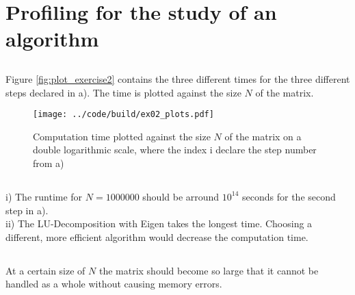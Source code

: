 \section{ Profiling for the study of an algorithm}

\subsection{}
\subsection{}
Figure \autoref{fig:plot_exercise2} contains the three different times for the three different steps declared in a).
The time is plotted against the size $N$ of the matrix.

\begin{figure}[h]
    \centering
    \texttt{[image: ../code/build/ex02\_plots.pdf]}
    \caption{Computation time plotted against the size $N$ of the matrix on a double logarithmic scale, where the index i declare the step number from a)}
    \label{fig:plot_exercise2}
\end{figure}

\subsection{}
i) The runtime for $N= 1000000$ should be arround $10^{14}$ seconds for the second step in a).\\
ii) The LU-Decomposition with Eigen takes the longest time. Choosing a different, more efficient algorithm would decrease the computation time.
\subsection{}

At a certain size of $N$ the matrix should become so large that it cannot be handled as a whole without causing memory errors.